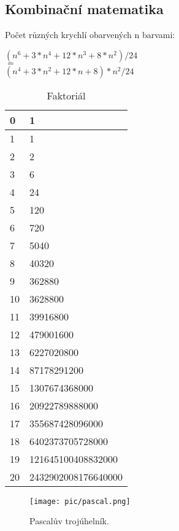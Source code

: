 \documentclass[11pt]{article}
\begin{document}
\subsection{Kombinační matematika}
Počet různých krychlí obarvených n barvami:
\begin{center}
$(n^6+3*n^4+12*n^3+8*n^2)/24$
\\$=$
\\$(n^4+3*n^2+12*n+8)*n^2/24$
\end{center}
\begin{table}[H]
\centering
\caption{Faktoriál}
\begin{tabular}{|l|l|}
\hline
0&1\\ \hline
1&1\\ \hline
2&2\\ \hline
3&6\\ \hline
4&24\\ \hline
5&120\\ \hline
6&720\\ \hline
7&5040\\ \hline
8&40320\\ \hline
9&362880\\ \hline
10&3628800\\ \hline
11&39916800\\ \hline
12&479001600\\ \hline
13&6227020800\\ \hline
14&87178291200\\ \hline
15&1307674368000\\ \hline
16&20922789888000\\ \hline
17&355687428096000\\ \hline
18&6402373705728000\\ \hline
19&121645100408832000\\ \hline
20&2432902008176640000\\ \hline
\end{tabular}
\end{table}
\begin{figure}[H]
  \centering
  \texttt{[image: pic/pascal.png]}
  \caption[Pascalův trojúhelník.]{Pascalův trojúhelník.}
\end{figure}
\end{document}
